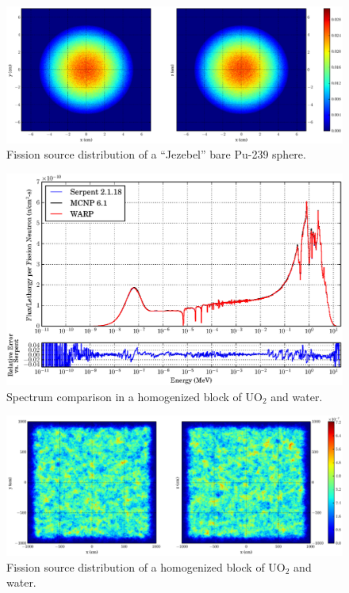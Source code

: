 \begin{figure}[h!]
\centering
\includegraphics[width=\textwidth,trim= 5cm 0cm 7cm 0cm]{graphics/finalresults/godiva_fiss-6.eps}
\caption{Fission source distribution of a ``Jezebel'' bare Pu-239 sphere. \label{godiva_fiss} }
\end{figure}

\begin{figure}[h!] 
\centering
\includegraphics[width=\textwidth,trim= 1cm 0cm 1cm 0cm]{graphics/finalresults/homfuel_spec-6.eps}
\caption{Spectrum comparison in a homogenized block of UO$_2$ and water. \label{homfuel_spec} }
\end{figure}

\begin{figure}[h!]
\centering
\includegraphics[width=\textwidth,trim= 5cm 0cm 7cm 0cm]{graphics/finalresults/homfuel_fiss-6.eps}
\caption{Fission source distribution of a homogenized block of UO$_2$ and water. \label{homfuel_fiss} }
\end{figure}


